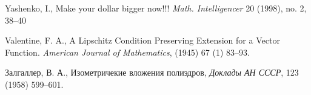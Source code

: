 \begin{thebibliography}{52}
 Yashenko, I.,
Make your dollar bigger now!!! 
\textit{Math. Intelligencer} 20 (1998), no. 2, 38--40

 Valentine, F. A.,  
A Lipschitz Condition Preserving Extension for a Vector Function. \textit{American Journal of Mathematics}, (1945) 67 (1) 83--93.


\begin{otherlanguage}{russian}
Залгаллер, В. А.,
Изометричекие вложения полиэдров,
\textit{Доклады АН СССР},
123 (1958) 599--601.
\end{otherlanguage}

\end{thebibliography}
